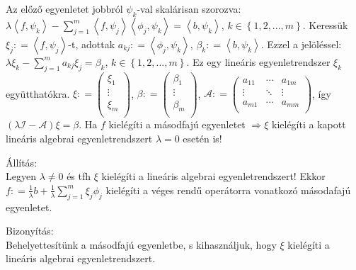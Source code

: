 \documentclass[12pt,a4paper]{scrartcl}
\newenvironment{bizonyitas}{}{}
\newenvironment{allitas}{}{}
\begin{document}
Az előző egyenletet jobbról \(\psi_{k}\)-val skalárisan szorozva:
\(\lambda\left\langle {f,\psi_{k}} \right\rangle - {\sum\limits_{j = 1}^{m}{\left\langle {f,\psi_{j}} \right\rangle\left\langle {\phi_{j},\psi_{k}} \right\rangle}} = \left\langle {b,\psi_{k}} \right\rangle\),
\(k \in \left\{ {1,2,...,m} \right\}\). Keressük
\(\xi_{j}: = \left\langle {f,\psi_{j}} \right\rangle\)-t, adottak
\(a_{kj}: = \left\langle {\phi_{j},\psi_{k}} \right\rangle\),
\(\beta_{k}: = \left\langle {b,\psi_{k}} \right\rangle\). Ezzel a
jelöléssel:
\(\lambda\xi_{k} - {\sum\limits_{j = 1}^{m}{a_{kj}\xi_{j}}} = \beta_{k}\),
\(k \in \left\{ {1,2,...,m} \right\}\). Ez egy lineáris egyenletrendszer
\(\xi_{k}\) együtthatókra.
\(\xi: = \left( \begin{array}{l} \xi_{1} \\  \vdots \\ \xi_{m} \\ \end{array} \right)\),
\(\beta: = \left( \begin{array}{l} \beta_{1} \\  \vdots \\ \beta_{m} \\ \end{array} \right)\),
\(\mathcal{A}: = \left( \begin{array}{lll} a_{11} & \cdots & a_{1m} \\  \vdots & \ddots & \vdots \\ a_{m1} & \cdots & a_{mm} \\ \end{array} \right)\),
így \(\left( {\lambda\mathcal{I} - \mathcal{A}} \right)\xi = \beta\). Ha
\(f\) kielégíti a másodfajú egyenletet \(\left. \Rightarrow\xi \right.\)
kielégíti a kapott lineáris algebrai egyenletrendszert \(\lambda = 0\)
esetén is!

\begin{allitas}

Állítás:\\
Legyen \(\lambda \neq 0\) és tfh \(\xi\) kielégíti a lineáris algebrai
egyenletrendszert! Ekkor
\(f: = \frac{1}{\lambda}b + \frac{1}{\lambda}{\sum\limits_{j = 1}^{m}{\xi_{j}\phi_{j}}}\)
kielégíti a véges rendű operátorra vonatkozó másodafajú egyenletet.

\end{allitas}

\begin{bizonyitas}

Bizonyítás:\\
Behelyettesítünk a másodfajú egyenletbe, s kihasználjuk, hogy \(\xi\)
kielégíti a lineáris algebrai egyenletrendszert.

\end{bizonyitas}
\end{document}
